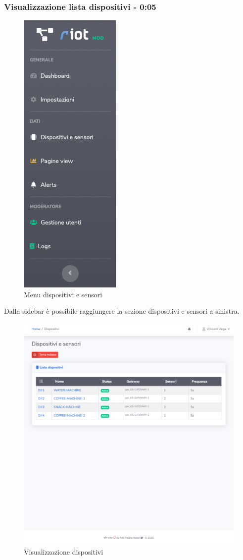 	\subsubsection{Visualizzazione lista dispositivi - 0:05}
		\begin{figure}[H]
		\centering
		\includegraphics[scale=0.600]{res/images/membro/menuDisp.png}
		\caption{Menu dispositivi e sensori}
		\end{figure}
		Dalla sidebar è possibile raggiungere la sezione dispositivi e sensori a sinistra. 
		\begin{figure}[H]
		\centering
		\includegraphics[scale=0.600]{res/images/membro/visDispositivi.png}
		\caption{Visualizzazione dispositivi}
		\end{figure}
